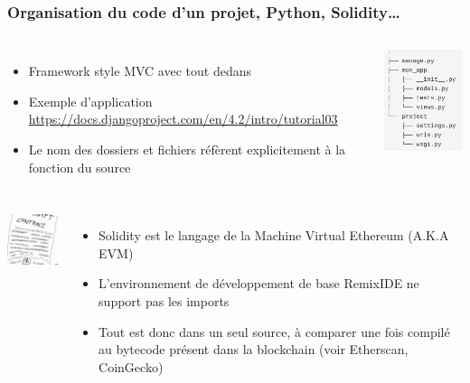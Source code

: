 \documentclass{beamer}
\begin{document}
    \begin{frame}
        \transdissolve
        \frametitle{Organisation du code d'un projet, Python, Solidity\ldots}

        \begin{columns}


            \begin{itemize}

                \item Framework style MVC avec tout dedans
                \item Exemple d'application \url{https://docs.djangoproject.com/en/4.2/intro/tutorial03}
                \item Le nom des dossiers et fichiers réfèrent explicitement à la fonction du source

            \end{itemize}


            \centering
            \includegraphics[width=3cm]{image/flask-project-structure.png}

        \end{columns}

        \begin{columns}


            \centering
            \includegraphics[width=3cm]{image/smart-contract.png}

            \begin{itemize}

                \item Solidity est le langage de la Machine Virtual Ethereum (A.K.A EVM)
                \item L'environnement de développement de base RemixIDE ne support pas les imports
                \item Tout est donc dans un seul source, à comparer une fois compilé au bytecode présent dans la blockchain (voir Etherscan, CoinGecko)

            \end{itemize}


        \end{columns}

    \end{frame}
\end{document}
